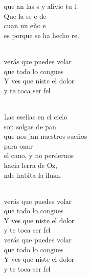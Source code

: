 \documentclass[12pt]{article}
\begin{document}
\begin{multicols*}{2}
\begin{cancion}
	que an las s y alivie tu l.\\
	Que la  se e de \\
	cuan un eño e\\
	es porque se ha hecho re.\\\jump\\
	\begin{chorus}%
	verás que puedes volar\\
	que todo lo congues\\
	Y ves que niste el dolor \\
	y te toca ser fel\\
	\end{chorus}%
	\jump\\
	Las esellas en el cielo\\
	son solgas de pan\\
	que nos jan nuestros sueños\\
	para onar\\
	el cano, y no perdernos\\
	hacia lerra de Oz,\\
	nde habita la ilusn. \\\jump\\
	\begin{chorus}%
	verás que puedes volar\\
	que todo lo congues\\
	Y ves que niste el dolor \\
	y te toca ser fel\\
\jump
	verás que puedes volar\\
	que todo lo congues\\
	Y ves que niste el dolor \\
	y te toca ser fel\\
	\end{chorus}%
	\jump\\
\end{cancion}%


\end{multicols*}
\end{document}
